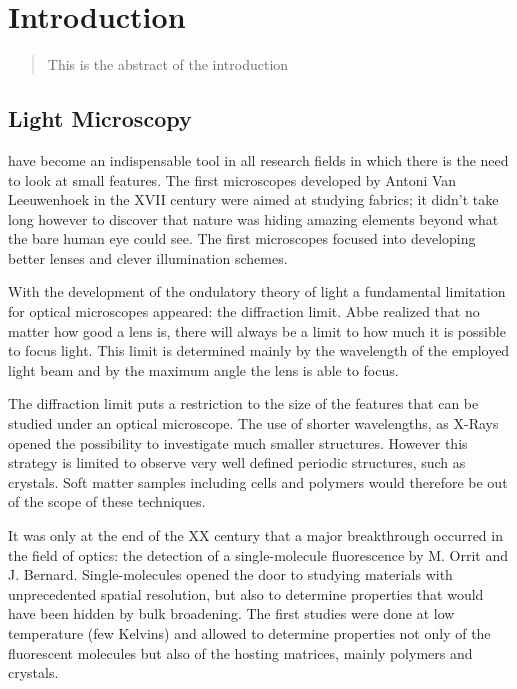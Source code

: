 \chapter{Introduction}
\label{chapter_1}

\begin{abstract}
This is the abstract of the introduction
\end{abstract}

\newpage

\section{Light Microscopy}
 have become an indispensable tool in all research fields
in which there is the need to look at small features. The first microscopes
developed by Antoni Van Leeuwenhoek in the XVII century were aimed at studying
fabrics; it didn't take long however to discover that nature was hiding amazing
elements beyond what the bare human eye could see. The first microscopes focused
into developing better lenses and clever illumination schemes. 

With the development of the ondulatory theory of light a fundamental limitation
for optical microscopes appeared: the diffraction limit. Abbe realized that no
matter how good a lens is, there will always be a limit to how much it is
possible to focus light. This limit is determined mainly by the wavelength of
the employed light beam and by the maximum angle the lens is able to focus. 

The diffraction limit puts a restriction to the size of the features that can be
studied under an optical microscope. The use of shorter wavelengths, as X-Rays
opened the possibility to investigate much smaller structures. However this
strategy is limited to observe very well defined periodic structures, such as
crystals. Soft matter samples including cells and polymers would therefore be
out of the scope of these techniques.

It was only at the end of the XX century that a major breakthrough occurred in
the field of optics: the detection of a single-molecule fluorescence by M.
Orrit and J. Bernard. Single-molecules opened the door to studying materials
with unprecedented spatial resolution, but also to determine properties that
would have been hidden by bulk broadening. The first studies were done at low
temperature (few Kelvins) and allowed to determine properties not only of the
fluorescent molecules but also of the hosting matrices, mainly polymers and
crystals.

